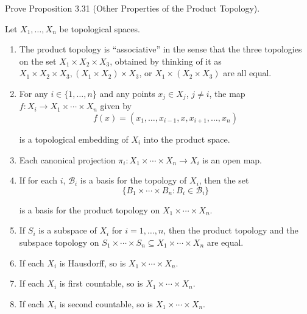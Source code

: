 \begin{exercise}{3.32}
	Prove Proposition 3.31 (Other Properties of the Product Topology).

	Let $X_{1}, \ldots, X_{n}$ be topological spaces.
	\begin{enumerate}[label={(\alph*)}]
		\item The product topology is ``associative'' in the sense that the three topologies on
		      the set $X_{1} \times X_{2} \times X_{3}$, obtained by thinking of it as $X_{1} \times X_{2} \times X_{3}, (X_{1} \times X_{2}) \times X_{3}$, or $X_{1} \times (X_{2} \times X_{3})$ are all equal.
		\item For any $i\in\{1,\ldots,n\}$ and any points $x_{j}\in X_{j}$, $j\ne i$, the map $f: X_{i}\to X_{1}\times \cdots \times X_{n}$ given by
		      \[
			      f(x) = (x_{1}, \ldots, x_{i-1}, x, x_{i+1}, \ldots, x_{n})
		      \]

		      is a topological embedding of $X_{i}$ into the product space.
		\item Each canonical projection $\pi_{i}: X_{1}\times\cdots\times X_{n}\to X_{i}$ is an open map.
		\item If for each $i$, $\mathscr{B}_{i}$ is a basis for the topology of $X_{i}$, then the set
		      \[
			      \{ B_{1}\times\cdots\times B_{n} : B_{i}\in\mathscr{B}_{i} \}
		      \]

		      is a basis for the product topology on $X_{1}\times\cdots\times X_{n}$.
		\item If $S_{i}$ is a subspace of $X_{i}$ for $i = 1,\ldots,n$, then the product topology and the subspace topology on $S_{1}\times \cdots \times S_{n}\subseteq X_{1}\times \cdots\times X_{n}$ are equal.
		\item If each $X_{i}$ is Hausdorff, so is $X_{1}\times\cdots\times X_{n}$.
		\item If each $X_{i}$ is first countable, so is $X_{1}\times\cdots\times X_{n}$.
		\item If each $X_{i}$ is second countable, so is $X_{1}\times\cdots\times X_{n}$.
	\end{enumerate}
\end{exercise}

